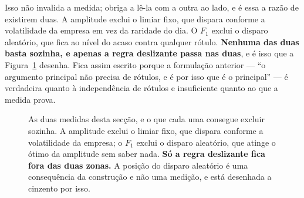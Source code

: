 Isso não invalida a medida; obriga a lê-la com a outra ao lado, e é essa a razão de existirem duas.
A amplitude exclui o limiar fixo, que dispara conforme a volatilidade da empresa em vez da raridade
do dia. O $F_1$ exclui o disparo aleatório, que fica ao nível do acaso contra qualquer rótulo.
\textbf{Nenhuma das duas basta sozinha, e apenas a regra deslizante passa nas duas}, e é isso que
a Figura~\ref{fig:av_duasmedidas} desenha. Fica assim
escrito porque a formulação anterior --- ``o argumento principal não precisa de rótulos, e é por
isso que é o principal'' --- é verdadeira quanto à independência de rótulos e insuficiente quanto
ao que a medida prova.

\begin{figure}[!htbp]
\centering
{}
\caption[O que cada medida da QI1 exclui]{As duas medidas desta secção, e o que cada uma
consegue excluir sozinha. A amplitude exclui o limiar fixo, que dispara conforme a volatilidade
da empresa; o $F_1$ exclui o disparo aleatório, que atinge o ótimo da amplitude sem saber nada.
\textbf{Só a regra deslizante fica fora das duas zonas.} A posição do disparo aleatório é uma
consequência da construção e não uma medição, e está desenhada a cinzento por isso.}
\label{fig:av_duasmedidas}
\end{figure}

